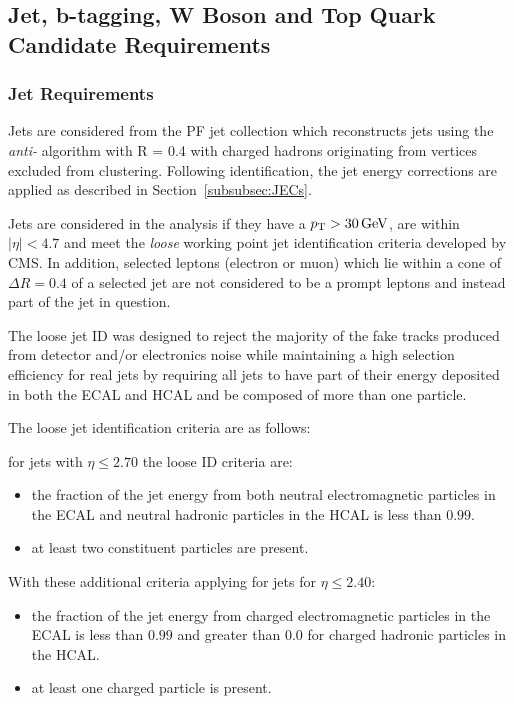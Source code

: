 \subsection{Jet, b-tagging, W Boson and Top Quark Candidate Requirements}
\subsubsection{Jet Requirements}
Jets are considered from the PF jet collection which reconstructs jets using the \emph{anti-\kt} algorithm with R = 0.4 with charged hadrons originating from \PU vertices excluded from clustering.
Following identification, the jet energy corrections are applied as described in Section~\ref{subsubsec:JECs}.

Jets are considered in the analysis if they have a $p_{\mathrm{T}} > 30\,\text{Ge\hspace{-.08em}V}$, are within $|\eta| < 4.7$ and meet the \emph{loose} working point jet identification criteria developed by CMS.
In addition, selected leptons (electron or muon) which lie within a cone of $\Delta R = 0.4$ of a selected jet are not considered to be a prompt leptons and instead part of the jet in question.

The loose jet ID was designed to reject the majority of the fake tracks produced from detector and/or electronics noise while maintaining a high selection efficiency for real jets by requiring all jets to have part of their energy deposited in both the ECAL and HCAL and be composed of more than one particle.

The loose jet identification criteria are as follows:

for jets with $\eta \leq 2.70$ the loose ID criteria are:
\begin{itemize}
\item the fraction of the jet energy from both neutral electromagnetic particles in the ECAL and neutral hadronic particles in the HCAL is less than $0.99$.
\item at least two constituent particles are present.
\end{itemize}

With these additional criteria applying for jets for $\eta \leq 2.40$:
\begin{itemize}
\item the fraction of the jet energy from charged electromagnetic particles in the ECAL is less than $0.99$ and greater than 0.0 for charged hadronic particles in the HCAL.
\item at least one charged particle is present.
\end{itemize}

